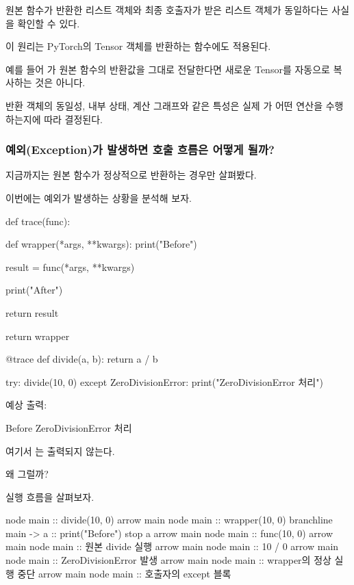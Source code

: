 원본 함수가 반환한 리스트 객체와 최종 호출자가 받은 리스트 객체가 동일하다는 사실을 확인할 수 있다.

이 원리는 PyTorch의 Tensor 객체를 반환하는 함수에도 적용된다.

예를 들어 가 원본 함수의 반환값을 그대로 전달한다면 새로운 Tensor를 자동으로 복사하는 것은 아니다.

반환 객체의 동일성, 내부 상태, 계산 그래프와 같은 특성은 실제 가 어떤 연산을 수행하는지에 따라 결정된다.

\subsubsection{예외(Exception)가 발생하면 호출 흐름은 어떻게 될까?}

지금까지는 원본 함수가 정상적으로 반환하는 경우만 살펴봤다.

이번에는 예외가 발생하는 상황을 분석해 보자.

\begin{dhkcode}
def trace(func):

    def wrapper(*args, **kwargs):
        print("Before")

        result = func(*args, **kwargs)

        print("After")

        return result

    return wrapper


@trace
def divide(a, b):
    return a / b


try:
    divide(10, 0)
except ZeroDivisionError:
    print("ZeroDivisionError 처리")
\end{dhkcode}

예상 출력:

\begin{dhkzsh}
Before
ZeroDivisionError 처리
\end{dhkzsh}

여기서 는 출력되지 않는다.

왜 그럴까?

실행 흐름을 살펴보자.

\begin{dhkbranch}[in=8]
node main :: divide(10, 0)
arrow main
node main :: wrapper(10, 0)
branchline main -> a :: print("Before")
stop a
arrow main
node main :: func(10, 0)
arrow main
node main :: 원본 divide 실행
arrow main
node main :: 10 / 0
arrow main
node main :: ZeroDivisionError 발생
arrow main
node main :: wrapper의 정상 실행 중단
arrow main
node main :: 호출자의 except 블록
\end{dhkbranch}

